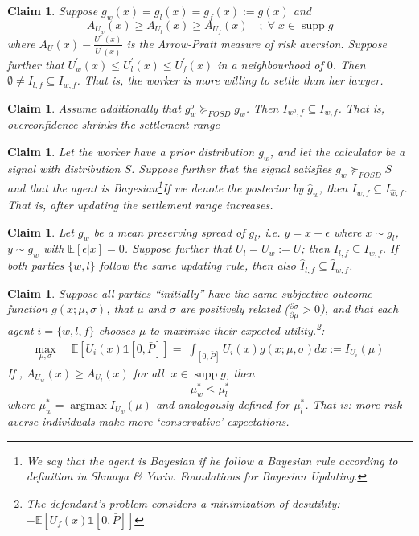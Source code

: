 \documentclass[10pt]{article}
\newtheorem{claim}[theorem]{Claim}
\begin{document}
\begin{claim}
\label{claim1}
Suppose $g_w(x)=g_l(x)=g_f(x):=g(x)$  and 
\[A_{U_w}(x)\geq A_{U_l}(x)\geq A_{U_f}(x)\quad ;\;\forall\;x\in \operatorname{supp} g \]
where $A_{U}(x)-\frac{U^{\prime\prime}(x)}{U^{\prime}(x)}$ is the Arrow-Pratt measure of risk aversion. Suppose further that $U_w^{\prime}(x)\leq U_l^{\prime}(x)\leq U_f^{\prime}(x)$ in a neighbourhood of $0$. Then $\emptyset\neq I_{l,f}\subseteq I_{w,f}$. That is, the worker is more willing to settle than her lawyer.
\end{claim}

\begin{claim}
\label{claim2}
Assume additionally that $g^o_w \succeq_{FOSD} g_w$. Then $I_{w^o,f} \subseteq I_{w,f}$. That is, overconfidence shrinks the settlement range
\end{claim}

\begin{claim}
\label{claim3}
Let the worker have a prior distribution $g_w$, and let the calculator be a signal with distribution $S$. Suppose further that the signal satisfies  $g_w \succeq_{FOSD} S$ and that the agent is Bayesian\footnote{We say that the agent is Bayesian if he follow a \emph{Bayesian rule} according to definition in \textit{Shmaya \& Yariv. Foundations for Bayesian Updating.}}If we denote the posterior by $\hat{g}_w$, then $I_{w,f} \subseteq I_{\hat{w},f}$. That is, after updating the settlement range increases.
\end{claim}

\begin{claim}
\label{claim4}
Let $g_w$ be a mean preserving spread of $g_l$, i.e. $y=x+\epsilon$ where $x\sim g_l$, $y\sim g_w$ with $\mathbb{E}[\epsilon| x]=0$. Suppose further that $U_l=U_w:=U$; then
$I_{l,f}\subseteq I_{w,f}$. If both parties $\lbrace w, l\rbrace$ follow the same updating rule, then also $\hat{I}_{l,f}\subseteq \hat{I}_{w,f}$.
\end{claim}


\begin{claim}
\label{claim5}
Suppose all parties ``initially'' have the same subjective outcome function $g(x;\mu,\sigma)$, that $\mu$ and $\sigma$ are positively related ($\frac{\partial \sigma}{\partial \mu}>0$), and that each agent $i=\{w,l,f\}$ chooses $\mu$ to maximize their expected utility.\footnote{The defendant's problem considers a minimization of desutility: $-\mathbb{E}\left[U_f(x)\mathds{1}[0,\bar{P}]\right]$}:
\begin{align}
\label{max_problem_l}
\underset{\mu, \sigma}{\max}\;\;  & \mathbb{E}\left[U_i(x)\mathds{1}[0,\bar{P}]\right]=\; \int_{[0,\bar{P}]}U_i(x)g(x;\mu,\sigma)dx:=I_{U_i}(\mu) 
\end{align}
If , $A_{U_w}(x)\geq A_{U_l}(x)$ for all $\;x\in \operatorname{supp} g$, then 
\[\mu^{*}_w\leq \mu^{*}_l\]
where $\mu_w^{*}=\operatorname{argmax} I_{U_w}(\mu)$ and analogously defined for  $\mu^{*}_l$. That is: more risk averse individuals make more `conservative' expectations.
\end{claim}
\end{document}
